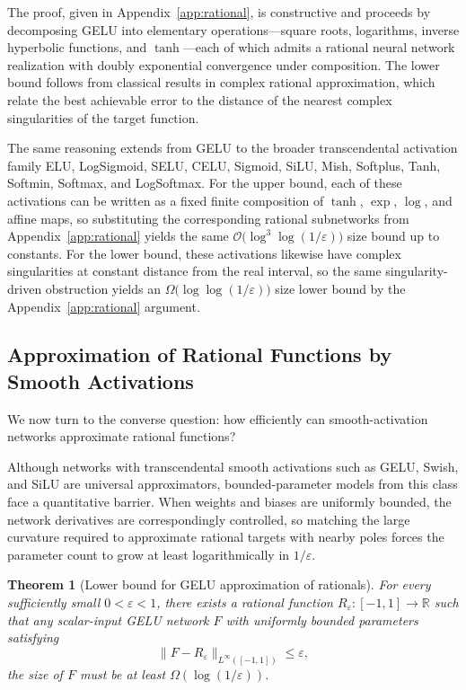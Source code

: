 \documentclass{article}
\theoremstyle{plain}
\newtheorem{theorem}{Theorem}[section]
\theoremstyle{definition}
\theoremstyle{remark}
\begin{document}
The proof, given in Appendix~\ref{app:rational}, is constructive and proceeds by decomposing GELU into elementary operations—square roots, logarithms, inverse hyperbolic functions, and $\tanh$—each of which admits a rational neural network realization with doubly exponential convergence under composition.  
The lower bound follows from classical results in complex rational approximation, which relate the best achievable error to the distance of the nearest complex singularities of the target function.

 {The same reasoning extends from GELU to the broader transcendental activation family ELU, LogSigmoid, SELU, CELU, Sigmoid, SiLU, Mish, Softplus, Tanh, Softmin, Softmax, and LogSoftmax. For the upper bound, each of these activations can be written as a fixed finite composition of $\tanh$, $\exp$, $\log$, and affine maps, so substituting the corresponding rational subnetworks from Appendix~\ref{app:rational} yields the same $\mathcal{O}\bigl(\log^3\!\log(1/\varepsilon)\bigr)$ size bound up to constants. For the lower bound, these activations likewise have complex singularities at constant distance from the real interval, so the same singularity-driven obstruction yields an $\Omega\bigl(\log\!\log(1/\varepsilon)\bigr)$ size lower bound by the Appendix~\ref{app:rational} argument.}




\subsection{Approximation of Rational Functions by Smooth Activations}
\label{subsec:backward}

We now turn to the converse question: how efficiently can smooth-activation networks approximate rational functions?

Although networks with transcendental smooth activations such as GELU, Swish, and SiLU are universal approximators, bounded-parameter models from this class face a quantitative barrier. When weights and biases are uniformly bounded, the network derivatives are correspondingly controlled, so matching the large curvature required to approximate rational targets with nearby poles forces the parameter count to grow at least logarithmically in $1/\varepsilon$.

\begin{theorem}[Lower bound for GELU approximation of rationals]
\label{thm:rational_to_gelu_lower}
 {For every sufficiently small $0<\varepsilon<1$, there exists a rational function $R_\varepsilon:[-1,1]\to\mathbb{R}$ such that any scalar-input GELU network $F$ with uniformly bounded parameters satisfying}
\[
\|F-R_\varepsilon\|_{L^\infty([-1,1])}\le \varepsilon,
\]
the size of $F$ must be at least $\Omega(\log(1/\varepsilon))$.
\end{theorem}
\end{document}

